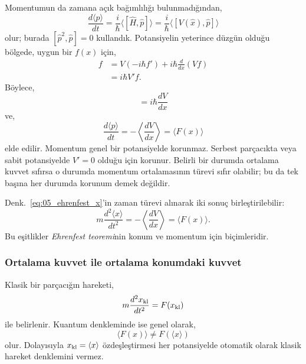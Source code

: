 Momentumun da zamana açık bağımlılığı bulunmadığından,
\begin{equation}
 \frac{d\langle p\rangle}{dt}
 =\frac{i}{\hbar}\langle[\hat H,\hat p]\rangle
 =\frac{i}{\hbar}\langle[V(\hat x),\hat p]\rangle
\end{equation}
olur; burada $[\hat p^2,\hat p]=0$ kullandık. Potansiyelin yeterince
düzgün olduğu bölgede, uygun bir $f(x)$ için,
\begin{align}
 [V,\hat p]f
 &=V(-i\hbar f')+i\hbar\frac{d}{dx}(Vf)\\
 &=i\hbar V'f.
\end{align}
Böylece,
\begin{equation}
 [V,\hat p]=i\hbar\frac{dV}{dx}
\end{equation}
ve,
\begin{equation}
 \boxed{\frac{d\langle p\rangle}{dt}
       =-\left\langle\frac{dV}{dx}\right\rangle
       =\langle F(x)\rangle}
 \label{eq:05_ehrenfest_p}
\end{equation}
elde edilir. Momentum genel bir potansiyelde korunmaz. Serbest
parçacıkta veya sabit potansiyelde $V'=0$ olduğu için korunur.
Belirli bir durumda ortalama kuvvet sıfırsa o durumda momentum
ortalamasının türevi sıfır olabilir; bu da tek başına her durumda
korunum demek değildir.

Denk.~\eqref{eq:05_ehrenfest_x}'in zaman türevi alınarak iki sonuç
birleştirilebilir:
\begin{equation}
 \boxed{m\frac{d^2\langle x\rangle}{dt^2}
       =-\left\langle\frac{dV}{dx}\right\rangle
       =\langle F(x)\rangle.}
 \label{eq:05_ehrenfest_newton}
\end{equation}
Bu eşitlikler \emph{Ehrenfest teoremi}nin konum ve momentum için
biçimleridir.

\subsubsection{Ortalama kuvvet ile ortalama konumdaki kuvvet}

Klasik bir parçacığın hareketi,
\begin{equation}
 m\frac{d^2x_{\rm kl}}{dt^2}=F(x_{\rm kl})
\end{equation}
ile belirlenir. Kuantum denkleminde ise genel olarak,
\begin{equation}
 \langle F(x)\rangle\ne F(\langle x\rangle)
 \label{eq:05_kuvvet_farki}
\end{equation}
olur. Dolayısıyla $x_{\rm kl}=\langle x\rangle$ özdeşleştirmesi
her potansiyelde otomatik olarak klasik hareket denklemini vermez.

